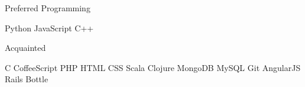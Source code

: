 \begin{cventries}
  \cventry
    {}
    {Preferred}
    {Programming}
    {}
    {
      \begin{cvitems}
        \item {Python \textbullet{}  JavaScript  \textbullet{}  C++}
      \end{cvitems}
    }
  \cventry
    {}
    {Acquainted}
    {}
    {}
    {
      \begin{cvitems}
        \item {C \textbullet{} CoffeeScript \textbullet{} PHP \textbullet{} HTML \textbullet{}  CSS \textbullet{} Scala \textbullet{} Clojure \textbullet{} MongoDB \textbullet{} MySQL \textbullet{} Git \textbullet{} AngularJS \textbullet{} Rails \textbullet{} Bottle }
      \end{cvitems}
    }
    
\end{cventries}
